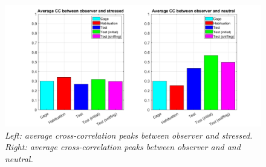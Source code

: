 \documentclass[a4paper]{article}
\begin{document}
\begin{figure}[H]
	
	\begin{center}
		\hspace*{-1.4cm}
		\includegraphics[scale=.4]{cc_average.png} 
	\end{center} 
	\caption{\textit{Left: average cross-correlation peaks between observer and stressed. Right: average cross-correlation peaks between observer and and neutral.}}
	
\end{figure}
\end{document}
